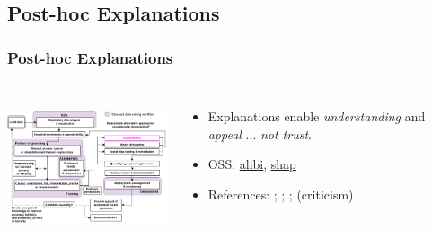 \documentclass[11pt,
               aspectratio=169,
               hyperref={colorlinks}
               ]{beamer}
\begin{document}
		\subsection{Post-hoc Explanations}
			
			\begin{frame}
		
				\frametitle{Post-hoc Explanations}		
			
				\begin{columns}
	
					\centering
					\includegraphics[height=120pt]{../img/exp.png}
				
					\vspace{-5pt}
					
					\small{
					\begin{itemize}
						\item Explanations enable \textit{understanding} and \textit{appeal} ... \textit{not trust}.
						\item OSS: \href{https://github.com/SeldonIO/alibi}{alibi}, \href{https://github.com/slundberg/shap}{shap} 
						\item References: ; ; ;  (criticism)
					\end{itemize}}
				
				\end{columns}
		
			\end{frame}
\end{document}
